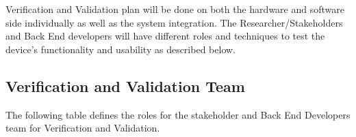 \documentclass[12pt, titlepage]{article}
\begin{document}
Verification and Validation plan will be done on both the hardware and software side individually as well as the system integration. The Researcher/Stakeholders and Back End developers will have different roles and techniques to test the device's functionality and usability as described below.

\subsection{Verification and Validation Team}

The following table defines the roles for the stakeholder and Back End Developers team for Verification and Validation.
\begin{center}
  \begin{tabular}{|m{5em}|m{5em}|m{25em}|}


\end{tabular}
\end{center}
\end{document}
